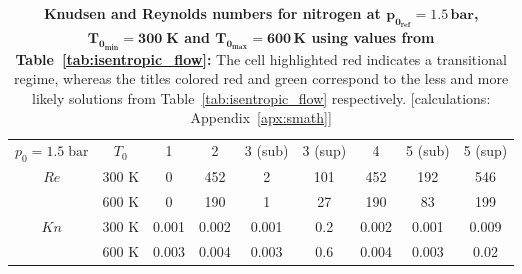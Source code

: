 \begin{table}[H]
    \centering
    \renewcommand{\arraystretch}{1.2}
    \begin{tabular}{|c|c||c|c|c|c|c|c|c|}
    \hline
    \multirow{2}{*}{\small $p_0 = 1.5\;\text{bar}$} 
        & \multirow{2}{*}{$T_0$} 
        & \multirow{2}{*}{1} 
        & \multirow{2}{*}{2} 
        & \multirow{2}{*}{\color{greenColor} 3 (sub)} 
        & \multirow{2}{*}{\color{redColor} 3 (sup)} 
        & \multirow{2}{*}{4} 
        & \multirow{2}{*}{\color{redColor} 5 (sub)} 
        & \multirow{2}{*}{\color{greenColor} 5 (sup)} \\
    & & & & & & & & \\ \hline \hline

    \multirow{2}{*}{$Re$} 
      & 300 K 
          & 0 
          & 452
          & 2
          & 101
          & 452
          & 192
          & 546 \\ \cline{2-9}
      & 600 K 
          & 0
          & 190
          & 1 
          & 27
          & 190
          & 83
          & 199 \\ \hline

    \multirow{2}{*}{$Kn$} 
      & 300 K 
          & 0.001 
          & 0.002
          & 0.001
          & \cellcolor[HTML]{FFADA8} 0.2 
          & 0.002
          & 0.001
          & 0.009 \\ \cline{2-9}
      & 600 K 
          & 0.003 
          & 0.004
          & 0.003
          & \cellcolor[HTML]{FFADA8} 0.6
          & 0.004
          & 0.003
          & 0.02 \\ \hline
    \end{tabular}
    \caption[Knudsen and Reynolds numbers for $p_{0_{ref}} = 1.5\,\text{bar}$, $T_{0_{min}} = 300 \text{K}$ and $T_{0_{max}} 600\,\mathrm{K}$ using values from table~\ref{tab:isentropic_flow}.]{
        \textbf{Knudsen and Reynolds numbers for nitrogen at $\bm{p_{0_{ref}} = 1.5\,\text{bar}}$, $\bm{T_{0_{min}} = 300\;\text{K}}$ and $\bm{T_{0_{max}} = 600\,\text{K}}$ using values from Table~\ref{tab:isentropic_flow}:}
        The cell highlighted red indicates a transitional regime, whereas the titles colored red and green correspond to the less and more likely solutions from Table~\ref{tab:isentropic_flow} respectively.
        [calculations: Appendix~\ref{apx:smath}]
    }
    \label{tab:test-knudsen-reynolds-isentropic}
\end{table}
